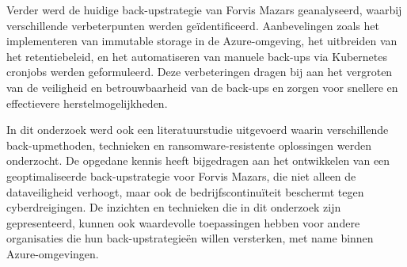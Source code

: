 Verder werd de huidige back-upstrategie van Forvis Mazars geanalyseerd, waarbij verschillende verbeterpunten werden geïdentificeerd. Aanbevelingen zoals het implementeren van immutable storage in de Azure-omgeving, het uitbreiden van het retentiebeleid, en het automatiseren van manuele back-ups via Kubernetes cronjobs werden geformuleerd. Deze verbeteringen dragen bij aan het vergroten van de veiligheid en betrouwbaarheid van de back-ups en zorgen voor snellere en effectievere herstelmogelijkheden.

In dit onderzoek werd ook een literatuurstudie uitgevoerd waarin verschillende back-upmethoden, technieken en ransomware-resistente oplossingen werden onderzocht. De opgedane kennis heeft bijgedragen aan het ontwikkelen van een geoptimaliseerde back-upstrategie voor Forvis Mazars, die niet alleen de dataveiligheid verhoogt, maar ook de bedrijfscontinuïteit beschermt tegen cyberdreigingen. De inzichten en technieken die in dit onderzoek zijn gepresenteerd, kunnen ook waardevolle toepassingen hebben voor andere organisaties die hun back-upstrategieën willen versterken, met name binnen Azure-omgevingen.















